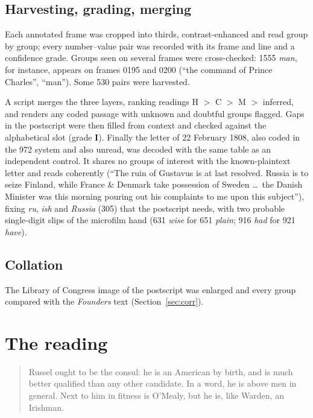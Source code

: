 \documentclass[11pt]{article}
\newcommand{\grp}[1]{\textsf{#1}}
\begin{document}
\subsection{Harvesting, grading, merging}

Each annotated frame was cropped into thirds, contrast-enhanced and read group by group; every number--value pair was recorded with its frame and line and a confidence grade. Groups seen on several frames were cross-checked: \grp{1555} \emph{man}, for instance, appears on frames 0195 and 0200 (``the command of Prince Charles'', ``man''). Some 530 pairs were harvested.

A script merges the three layers, ranking readings H $>$ C $>$ M $>$ inferred, and renders any coded passage with unknown and doubtful groups flagged. Gaps in the postscript were then filled from context and checked against the alphabetical slot (grade \textbf{I}). Finally the letter of 22 February 1808, also coded in the 972 system and also unread, was decoded with the same table as an independent control. It shares no groups of interest with the known-plaintext letter and reads coherently (``The ruin of Gustavus is at last resolved. Russia is to seize Finland, while France \& Denmark take possession of Sweden \ldots\ the Danish Minister was this morning pouring out his complaints to me upon this subject''), fixing \emph{ru}, \emph{ish} and \emph{Russia} (\grp{305}) that the postscript needs, with two probable single-digit slips of the microfilm hand (\grp{631} \emph{wise} for \grp{651} \emph{plain}; \grp{916} \emph{had} for \grp{921} \emph{have}).

\subsection{Collation}

The Library of Congress image of the postscript was enlarged and every group compared with the \emph{Founders} text (Section~\ref{sec:corr}).

\section{The reading}\label{sec:reading}

\begin{quote}
Russel ought to be the consul: he is an American by birth, and is much better qualified than any other candidate. In a word, he is above men in general. Next to him in fitness is O'Mealy, but he is, like Warden, an Irishman.
\end{quote}
\end{document}
